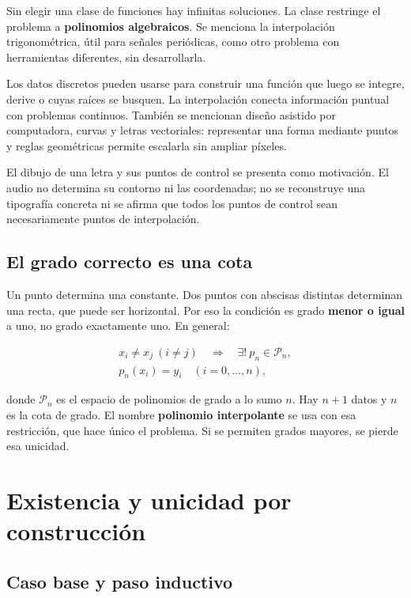 \documentclass[12pt,a4paper]{article}
\begin{document}
Sin elegir una clase de funciones hay infinitas soluciones. La clase restringe el problema a \textbf{polinomios algebraicos}. Se menciona la interpolación trigonométrica, útil para señales periódicas, como otro problema con herramientas diferentes, sin desarrollarla.

Los datos discretos pueden usarse para construir una función que luego se integre, derive o cuyas raíces se busquen. La interpolación conecta información puntual con problemas continuos. También se mencionan diseño asistido por computadora, curvas y letras vectoriales: representar una forma mediante puntos y reglas geométricas permite escalarla sin ampliar píxeles.

\begin{notebox}
El dibujo de una letra y sus puntos de control se presenta como motivación. El audio no determina su contorno ni las coordenadas; no se reconstruye una tipografía concreta ni se afirma que todos los puntos de control sean necesariamente puntos de interpolación.
\end{notebox}

\subsection{El grado correcto es una cota}

Un punto determina una constante. Dos puntos con abscisas distintas determinan una recta, que puede ser horizontal. Por eso la condición es grado \textbf{menor o igual} a uno, no grado exactamente uno. En general:

\[
\boxed{\begin{gathered}
x_i\ne x_j\ (i\ne j)\quad\Longrightarrow\quad
\exists!\ p_n\in\mathcal P_n,\\
p_n(x_i)=y_i\quad(i=0,\ldots,n),
\end{gathered}}
\]

 donde $\mathcal P_n$ es el espacio de polinomios de grado a lo sumo $n$. Hay $n+1$ datos y $n$ es la cota de grado. El nombre \textbf{polinomio interpolante} se usa con esa restricción, que hace único el problema. Si se permiten grados mayores, se pierde esa unicidad.

\section{Existencia y unicidad por construcción}

\subsection{Caso base y paso inductivo}
\end{document}
